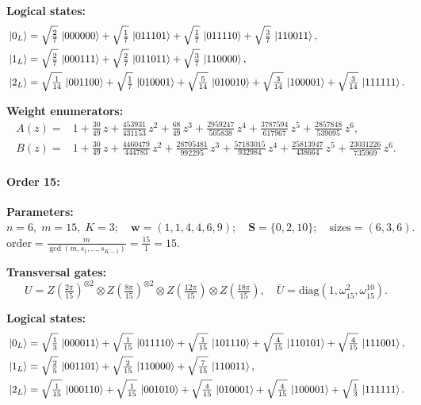 \documentclass[pdflatex,sn-nature]{sn-jnl}%
\theoremstyle{thmstyleone}%
\theoremstyle{thmstyletwo}%
\theoremstyle{thmstylethree}%
\begin{document}
\begin{appendices}
\noindent\textbf{Logical states:}
\begin{align*}
  &\ket{0_L} = \sqrt{\tfrac{2}{7}}\,\ket{000000} + \sqrt{\tfrac{1}{7}}\,\ket{011101} + \sqrt{\tfrac{1}{7}}\,\ket{011110} + \sqrt{\tfrac{3}{7}}\,\ket{110011}, \\
 &\ket{1_L} = \sqrt{\tfrac{2}{7}}\,\ket{000111} + \sqrt{\tfrac{2}{7}}\,\ket{011011} + \sqrt{\tfrac{3}{7}}\,\ket{110000}, \\
 &\ket{2_L} = \sqrt{\tfrac{1}{14}}\,\ket{001100} + \sqrt{\tfrac{1}{7}}\,\ket{010001} + \sqrt{\tfrac{5}{14}}\,\ket{010010} + \sqrt{\tfrac{3}{14}}\,\ket{100001} + \sqrt{\tfrac{3}{14}}\,\ket{111111}.
\end{align*}

\noindent\textbf{Weight enumerators:}
\begin{align*}
    A(z) = &1 + \tfrac{30}{49}\,z + \tfrac{453931}{431153}\,z^{2} + \tfrac{68}{49}\,z^{3} + \tfrac{2959247}{505838}\,z^{4} + \tfrac{3787594}{617967}\,z^{5} + \tfrac{2857848}{539095}\,z^{6}, \\
    B(z) = &1 + \tfrac{30}{49}\,z + \tfrac{4460479}{444783}\,z^{2} + \tfrac{28705481}{992295}\,z^{3} + \tfrac{57183015}{932984}\,z^{4} + \tfrac{25813947}{438664}\,z^{5} + \tfrac{23031226}{735969}\,z^{6}.
\end{align*}

\paragraph{\textbf{Order 15:}}
\noindent\textbf{Parameters:} $n=6,\; m=15,\; K=3;\quad \mathbf w=(1, 1, 4, 4, 6, 9);\quad \mathbf S=\{0, 2, 10\};\quad \text{sizes}=\left(6, 3, 6\right).$ $\displaystyle \text{order}=\frac{m}{\gcd(m,s_1,\dots,s_{K-1})}=\frac{15}{1}=15.$

\noindent\textbf{Transversal gates:}
\[
    U=Z \left(\tfrac{2\pi}{15}\right)^{\otimes2} \otimes Z \left(\tfrac{8\pi}{15}\right)^{\otimes2} \otimes Z \left(\tfrac{12\pi}{15}\right) \otimes Z \left(\tfrac{18\pi}{15}\right),\quad
    \overline U=\mathrm{diag}(1,\omega_{15}^{2},\omega_{15}^{10}).
\]

\noindent\textbf{Logical states:}
\begin{align*}
  &\ket{0_L} = \sqrt{\tfrac{1}{3}}\,\ket{000011} + \sqrt{\tfrac{1}{15}}\,\ket{011110} + \sqrt{\tfrac{1}{15}}\,\ket{101110} + \sqrt{\tfrac{4}{15}}\,\ket{110101} + \sqrt{\tfrac{4}{15}}\,\ket{111001}, \\
  &\ket{1_L} = \sqrt{\tfrac{2}{5}}\,\ket{001101} + \sqrt{\tfrac{2}{15}}\,\ket{110000} + \sqrt{\tfrac{7}{15}}\,\ket{110011}, \\
  &\ket{2_L} = \sqrt{\tfrac{1}{15}}\,\ket{000110} + \sqrt{\tfrac{1}{15}}\,\ket{001010} + \sqrt{\tfrac{4}{15}}\,\ket{010001} + \sqrt{\tfrac{4}{15}}\,\ket{100001} + \sqrt{\tfrac{1}{3}}\,\ket{111111}.
\end{align*}


\end{appendices}
\end{document}
